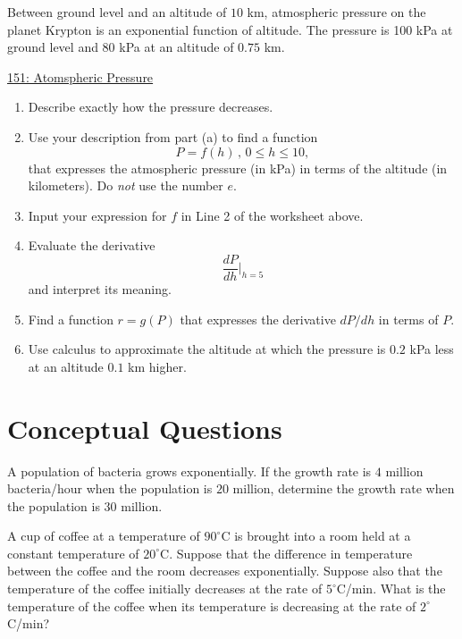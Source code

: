 \documentclass{ximera}
\begin{document}
\begin{question}  \label{Qgfhhfhdffv}
Between ground level and an altitude of $10$ km, atmospheric pressure on the planet Krypton is an exponential function of altitude. The pressure is 100 kPa at ground level and 80 kPa at an altitude of $0.75$ km.

\begin{onlineOnly}
    \begin{center}
\end{center}
\end{onlineOnly}

\href{https://www.desmos.com/calculator/j5h8kaj8xs}{151: Atomspheric Pressure}

\begin{enumerate}
\item Describe exactly how the pressure decreases.

\item Use your description from part (a) to find a function
\[
         P = f(h) \, , \, 0\leq h \leq 10 ,
\]
that expresses the atmospheric pressure (in kPa) in terms of the altitude (in kilometers). Do \emph{not} use the number $e$.

\item Input your expression for $f$ in Line 2 of the worksheet above.

\item Evaluate the derivative 
\[
       \frac{dP}{dh}\Big|_{h=5}
\]
and interpret its meaning.

\item Find a function $r=g(P)$ that expresses the derivative $dP/dh$ in terms of $P$.

\item Use calculus to approximate the altitude at which the pressure is $0.2$ kPa less at an altitude $0.1$ km higher.

\end{enumerate}
  
\end{question}


\section{Conceptual Questions}

\begin{question} \label{QdfadREGLER}
 A population of bacteria grows exponentially. If the growth rate is $4$ million bacteria/hour when the population is $20$ million, determine the growth rate when the population is $30$ million.

\end{question}

\begin{question} \label{QPKdkefERF}
A cup of coffee at a temperature of $90^\circ$C is brought into a room held at a constant temperature of $20^\circ$C. Suppose that the difference in temperature between the coffee and the room decreases exponentially. Suppose also that the temperature of the coffee initially decreases at the rate of $5^\circ$C/min. What is the temperature of the coffee when its temperature is decreasing at the rate of $2^\circ$C/min?
\end{question}
\end{document}
